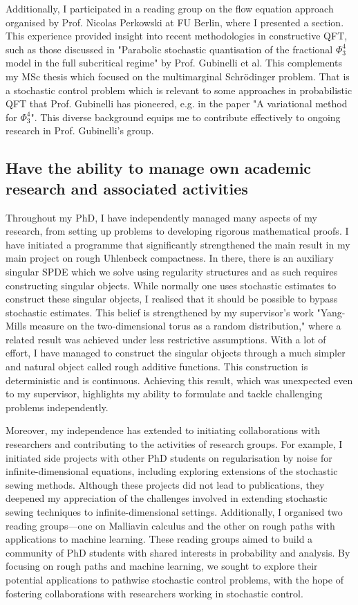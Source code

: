 \documentclass[12pt]{article}
\numberwithin{equation}{section}
\theoremstyle{definition}
\theoremstyle{remark}
\newcommand{\1}{\mathbf 1}
\newcommand{\<}{\langle}
\renewcommand{\>}{\rangle}
\begin{document}
Additionally, I participated in a reading group on the flow equation approach organised by Prof. Nicolas Perkowski at FU Berlin, where I presented a section. This experience provided insight into recent methodologies in constructive QFT, such as those discussed in "Parabolic stochastic quantisation of the fractional $\Phi^4_3$ model in the full subcritical regime" by Prof. Gubinelli et al. This complements my MSc thesis which focused on the multimarginal Schrödinger problem. That is a stochastic control problem which is relevant to some approaches in probabilistic QFT that Prof. Gubinelli has pioneered, e.g. in the paper "A variational method for $\Phi^4_3$". This diverse background equips me to contribute effectively to ongoing research in Prof. Gubinelli's group.

\subsection{Have the ability to manage own academic research and associated activities}
Throughout my PhD, I have independently managed many aspects of my research, from setting up problems to developing rigorous mathematical proofs. I have initiated a programme that significantly strengthened the main result in my main project on rough Uhlenbeck compactness. In there, there is an auxiliary singular SPDE which we solve using regularity structures and as such requires constructing singular objects. While normally one uses stochastic estimates to construct these singular objects, I realised that it should be possible to bypass stochastic estimates. This belief is strengthened by my supervisor's work  "Yang-Mills measure on the two-dimensional torus as a random distribution," where a related result was achieved under less restrictive assumptions. With a lot of effort, I have managed to construct the singular objects through a much  simpler and natural object called rough additive functions. This construction is deterministic and is continuous. Achieving this result, which was unexpected even to my supervisor, highlights my ability to formulate and tackle challenging problems independently.  



Moreover, my independence has extended to initiating collaborations with researchers and contributing to the activities of research groups. For example, I initiated side projects with other PhD students on regularisation by noise for infinite-dimensional equations, including exploring extensions of the stochastic sewing methods. Although these projects did not lead to publications, they deepened my appreciation of the challenges involved in extending stochastic sewing techniques to infinite-dimensional settings. Additionally, I organised two reading groups—one on Malliavin calculus and the other on rough paths with applications to machine learning. These reading groups aimed to build a community of PhD students with shared interests in probability and analysis. By focusing on rough paths and machine learning, we sought to explore their potential applications to pathwise stochastic control problems, with the hope of fostering collaborations with researchers working in stochastic control. 
\end{document}
